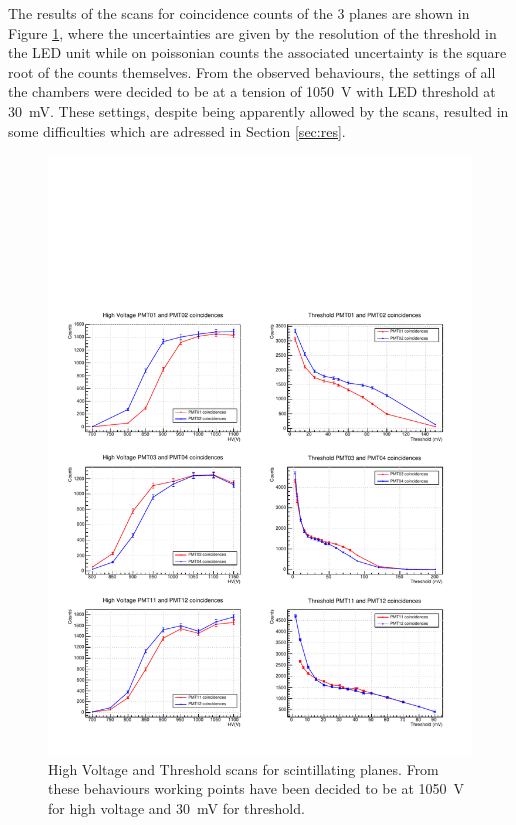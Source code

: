 \documentclass[../main.tex]{subfiles}
\begin{document}
The results of the scans for coincidence counts of the 3 planes are shown in Figure \ref{fig:hvthr}, where the uncertainties are given by the resolution of the threshold in the LED unit while on poissonian counts the associated uncertainty is the square root of the counts themselves. From the observed behaviours, the settings of all the chambers were decided to be at a tension of \SI{1050}{\volt} with LED threshold at \SI{30}{\milli \volt}. These settings, despite being apparently allowed by the scans, resulted in some difficulties which are adressed in Section \ref{sec:res}.

\begin{figure}[htb!]
    \centering
    \includegraphics[width = \linewidth]{images/hv-thr.pdf}
    \caption[High Voltage and Threshold scans for scintillating planes]{High Voltage and Threshold scans for scintillating planes. From these behaviours working points have been decided to be at \SI{1050}{\volt} for high voltage and \SI{30}{\milli \volt} for threshold.}
    \label{fig:hvthr}
\end{figure}
\end{document}
